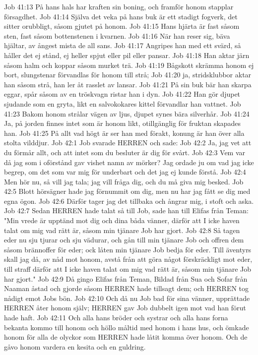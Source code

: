 Job 41:13  På hans hals har kraften sin boning, och framför honom stapplar försagdhet.
Job 41:14  Själva det veka på hans buk är ett stadigt fogverk, det sitter orubbligt, såsom gjutet på honom.
Job 41:15  Hans hjärta är fast såsom sten, fast såsom bottenstenen i kvarnen.
Job 41:16  När han reser sig, bäva hjältar, av ångest mista de all sans.
Job 41:17  Angripes han med ett svärd, så håller det ej stånd, ej heller spjut eller pil eller pansar.
Job 41:18  Han aktar järn såsom halm och koppar såsom murket trä.
Job 41:19  Bågskott skrämma honom ej bort, slungstenar förvandlas för honom till strå;
Job 41:20  ja, stridsklubbor aktar han såsom strå, han ler åt rasslet av lansar.
Job 41:21  På sin buk bär han skarpa eggar, spår såsom av en tröskvagn ristar han i dyn.
Job 41:22  Han gör djupet sjudande som en gryta, likt en salvokokares kittel förvandlar han vattnet.
Job 41:23  Bakom honom strålar vägen av ljus, djupet synes bära silverhår.
Job 41:24  Ja, på jorden finnes intet som är honom likt, otillgänglig för fruktan skapades han.
Job 41:25  På allt vad högt är ser han med förakt, konung är han över alla stolta vilddjur.
Job 42:1  Job svarade HERREN och sade:
Job 42:2  Ja, jag vet att du förmår allt, och att intet som du besluter är dig för svårt.
Job 42:3  Vem var då jag som i oförstånd gav vishet namn av mörker? Jag ordade ju om vad jag icke begrep, om det som var mig för underbart och det jag ej kunde förstå.
Job 42:4  Men hör nu, så vill jag tala; jag vill fråga dig, och du må giva mig besked.
Job 42:5  Blott hörsägner hade jag förnummit om dig, men nu har jag fått se dig med egna ögon.
Job 42:6  Därför tager jag det tillbaka och ångrar mig, i stoft och aska.
Job 42:7  Sedan HERREN hade talat så till Job, sade han till Elifas från Teman: "Min vrede är upptänd mot dig och dina båda vänner, därför att I icke haven talat om mig vad rätt är, såsom min tjänare Job har gjort.
Job 42:8  Så tagen eder nu sju tjurar och sju vädurar, och gån till min tjänare Job och offren dem såsom brännoffer för eder; ock låten min tjänare Job bedja för eder. Till äventyrs skall jag då, av nåd mot honom, avstå från att göra något förskräckligt mot eder, till straff därför att I icke haven talat om mig vad rätt är, såsom min tjänare Job har gjort."
Job 42:9  Då gingo Elifas från Teman, Bildad från Sua och Sofar från Naaman åstad och gjorde såsom HERREN hade tillsagt dem; och HERREN tog nådigt emot Jobs bön.
Job 42:10  Och då nu Job bad för sina vänner, upprättade HERREN åter honom själv; HERREN gav Job dubbelt igen mot vad han förut hade haft.
Job 42:11  Och alla hans bröder och systrar och alla hans forna bekanta kommo till honom och höllo måltid med honom i hans hus, och ömkade honom för alla de olyckor som HERREN hade låtit komma över honom. Och de gåvo honom vardera en kesita och en guldring.
